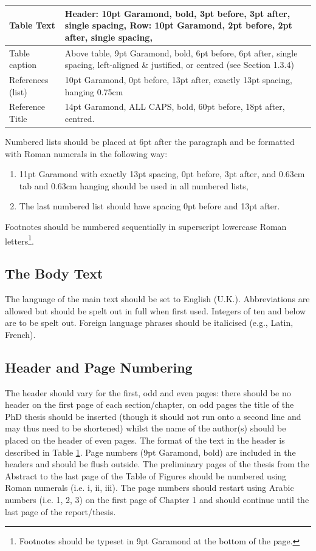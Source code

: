 \begin{table}[hbtp]
\begin{tabular}{|m{3cm}|m{9cm}|}
    \hline
    Table Text & Header: 10pt Garamond, bold, 3pt before, 3pt after, single spacing, Row: 10pt Garamond, 2pt before, 2pt after, single spacing, \\
    \hline
    Table caption & Above table, 9pt Garamond, bold, 6pt before, 6pt after, single spacing, left-aligned \& justified, or centred (see Section 1.3.4) \\
    \hline
    References (list) & 10pt Garamond, 0pt before, 13pt after, exactly 13pt spacing, hanging 0.75cm \\
    \hline
    Reference Title & 14pt Garamond, ALL CAPS, bold, 60pt before, 18pt after, centred. \\
    \hline
    \end{tabular}%
  \label{tab:Styles}%
\end{table}%

Numbered lists should be placed at 6pt after the paragraph and be formatted with Roman numerals in the following way:
\begin{enumerate}
    \item {}11pt Garamond with exactly 13pt spacing, 0pt before, 3pt after, and 0.63cm tab and 0.63cm hanging should be used in all numbered lists,
    \item The last numbered list should have spacing 0pt before and 13pt after.
\end{enumerate}

Footnotes should be numbered sequentially in superscript lowercase Roman letters\footnote{Footnotes should be typeset in 9pt Garamond at the bottom of the page.}.

\subsection{The Body Text}
The language of the main text should be set to English (U.K.). Abbreviations are allowed but should be spelt out in full when first used. Integers of ten and below are to be spelt out. Foreign language phrases should be italicised (e.g., Latin, French).

\subsection{Header and Page Numbering}
The header should vary for the first, odd and even pages: there should be no header on the first page of each section/chapter, on odd pages the title of the PhD thesis should be inserted (though it should not run onto a second line and may thus need to be shortened) whilst the name of the author(s) should be placed on the header of even pages.  The format of the text in the header is described in Table \ref{tab:Styles}. Page numbers (9pt Garamond, bold) are included in the headers and should be flush outside. The preliminary pages of the thesis from the Abstract to the last page of the Table of Figures should be numbered using Roman numerals (i.e. i, ii, iii).  The page numbers should restart using Arabic numbers (i.e. 1, 2, 3) on the first page of Chapter 1 and should continue until the last page of the report/thesis.

